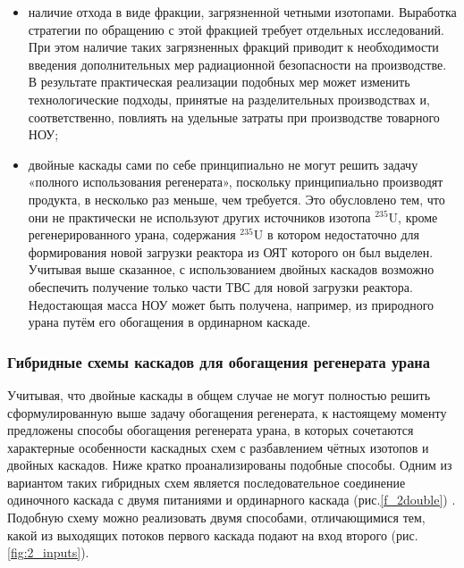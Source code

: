 \begin{itemize}
  \item наличие отхода в виде фракции, загрязненной четными изотопами. Выработка стратегии по обращению с этой фракцией требует отдельных исследований. При этом наличие таких загрязненных фракций приводит к необходимости введения дополнительных мер радиационной безопасности на производстве. В результате практическая реализации подобных мер может изменить технологические подходы, принятые на разделительных производствах и, соответственно, повлиять на удельные затраты при производстве товарного НОУ; 
  \item	двойные каскады сами по себе принципиально не могут решить задачу «полного использования регенерата», поскольку принципиально производят продукта, в несколько раз меньше, чем требуется. Это обусловлено тем, что они не практически не используют других источников изотопа $^{235}$U, кроме регенерированного урана, содержания $^{235}$U в котором недостаточно для формирования новой загрузки реактора из ОЯТ которого он был выделен. Учитывая выше сказанное, с использованием двойных каскадов возможно обеспечить получение только части ТВС для новой загрузки реактора. Недостающая масса НОУ может быть получена, например, из природного урана путём его обогащения в ординарном каскаде.
\end{itemize}


\subsubsection{Гибридные схемы каскадов для обогащения регенерата урана}

Учитывая, что двойные каскады в общем случае не могут полностью решить сформулированную выше задачу обогащения регенерата, к настоящему моменту предложены способы обогащения регенерата урана, в которых сочетаются характерные особенности каскадных схем с разбавлением чётных изотопов и двойных каскадов. Ниже кратко проанализированы подобные способы.
Одним из вариантом таких гибридных схем является последовательное соединение одиночного каскада с двумя питаниями и ординарного каскада (рис.\ref{f_2double}) \cite{palkinOchistkaRegenerirovannogoGeksaftorida2013}. Подобную схему можно реализовать двумя способами, отличающимися тем, какой из выходящих потоков первого каскада подают на вход второго (рис. \ref{fig:2_inputs}).


